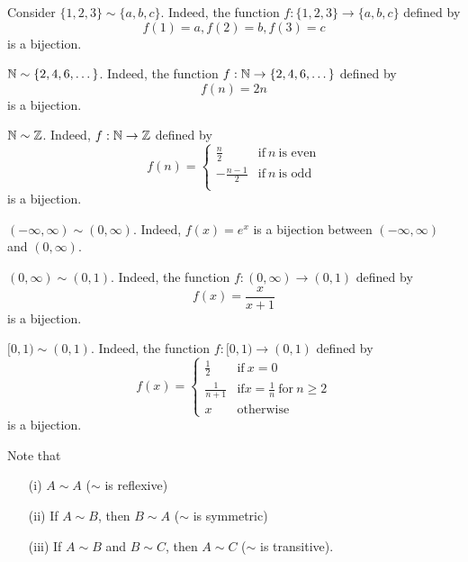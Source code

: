 \documentclass[a4paper]{report}
\begin{document}
\begin{eg}
   Consider \( \{ 1,2,3 \}  \sim \{ a,b,c \}  \). Indeed, the function \( f: \{ 1,2,3 \}  \to \{ a,b,c \}  \) defined by 
   \[ f(1) = a, f(2) = b, f(3) = c  \]
   is a bijection.
\end{eg}

\begin{eg}
    \( \mathbb{N} \sim \{ 2,4,6,\dots \}  \). Indeed, the function \( f: \mathbb{N} \to \{ 2,4,6,\dots \}   \) defined by 
    \[  f(n) = 2n \]
    is a bijection.
\end{eg}

\begin{eg}
    \( \mathbb{N} \sim \mathbb{Z}  \). Indeed, \( f: \mathbb{N} \to \mathbb{Z}  \) defined by
    \[  f(n) = 
    \begin{cases}
        \frac{ n }{ 2 }  &\text{if} \ n \ \text{is even} \\
        -\frac{ n - 1 }{ 2 }  &\text{if} \ n \ \text{is odd} \\
    \end{cases}  \]
    is a bijection.
\end{eg}

\begin{eg}
    \( (-\infty , \infty ) \sim (0,\infty ) \). Indeed, \( f(x) = e^{x}  \) is a bijection between \( (-\infty , \infty ) \) and \( (0,\infty ) \).
\end{eg}

\begin{eg}
    \( (0,\infty ) \sim (0,1) \). Indeed, the function \( f: (0,\infty) \to (0,1) \) defined by 
    \[  f(x) = \frac{ x  }{  x + 1  }  \] is a bijection.
\end{eg}

\begin{eg}
    \( [0,1) \sim (0,1) \). Indeed, the function \( f: [0,1) \to (0,1) \) defined by
    \[  f(x) = 
    \begin{cases}
        \frac{ 1 }{ 2 }  &\text{if} \ x = 0 \\ 
        \frac{ 1 }{ n+1 }  &\text{if} x = \frac{ 1 }{ n }  \ \text{for} \ n \geq 2 \\
        x &\text{otherwise}
    \end{cases}  \]
    is a bijection.
\end{eg}

\begin{definition}
    Note that 
    \begin{enumerate}
        \item[(i)] \( A \sim A \) (\( \sim  \) is reflexive) 
        \item[(ii)] If \( A \sim B  \), then \( B \sim A  \) (\( \sim  \) is symmetric) 
        \item[(iii)] If \( A \sim B  \) and \( B \sim C  \), then \( A \sim C  \) (\( \sim  \) is transitive).
    \end{enumerate}
\end{definition}
\end{document}
